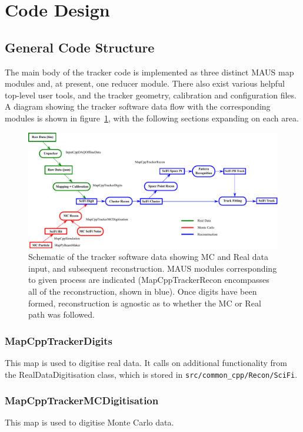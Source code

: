 \section{Code Design}
\label{Sect:CodeDesign}

\subsection{General Code Structure}

The main body of the tracker code is implemented as three distinct MAUS map modules and, at present, one reducer module.  There also exist various helpful top-level user tools, and the tracker geometry, calibration and configuration files. A diagram showing the tracker software data flow with the corresponding modules is shown in figure~\ref{Fig:DataFlow}, with the following sections expanding on each area.

\begin{figure}[htb]
    \includegraphics[width=1.0\textwidth]{detectors/tracker/06-CodeDesign/Figures/DataFlow.pdf}
    \caption{Schematic of the tracker software data showing MC and Real data input, and subsequent reconstruction. MAUS modules corresponding to given process are indicated (MapCppTrackerRecon encompasses all of the reconstruction, shown in blue).  Once digits have been formed, reconstruction is agnostic as to whether the MC or Real path was followed.}
    \label{Fig:DataFlow}
\end{figure}

\subsubsection{MapCppTrackerDigits}
This map is used to digitise real data.  It calls on additional functionality from the RealDataDigitisation class, which is stored in \verb;src/common_cpp/Recon/SciFi;.

\subsubsection{MapCppTrackerMCDigitisation}
This map is used to digitise Monte Carlo data.

